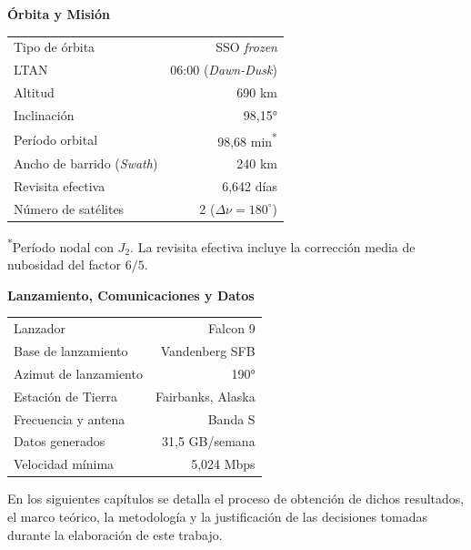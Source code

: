 \begin{table}[!htbp]
\vspace{2em}

\begin{minipage}[t]{0.495\textwidth}
\raggedright
\textbf{Órbita y Misión}
\vspace{0.3em}
\small
\begin{tabular}{@{} l r @{}}
\toprule
Tipo de órbita           & SSO \textit{frozen} \\
LTAN                     & 06:00 (\textit{Dawn-Dusk}) \\
Altitud                  & 690 km  \\
Inclinación              & 98,15° \\
Período orbital          & 98{,}68 min\textsuperscript{*}  \\
Ancho de barrido (\textit{Swath}) & 240 km \\
Revisita efectiva         & 6{,}642 días \\
Número de satélites      & 2 ($\Delta \nu = 180^\circ$)\\
\bottomrule
\end{tabular}
\par\smallskip
\noindent\textsuperscript{*}\footnotesize Período nodal con $J_2$. La revisita efectiva incluye la corrección media de nubosidad del factor $6/5$.
\end{minipage}%
\begin{minipage}[t]{0.495\textwidth}
\raggedleft
\textbf{Lanzamiento, Comunicaciones y Datos}
\vspace{0.3em}
\small
\begin{tabular}{@{} l r @{}}
\toprule
Lanzador                 & Falcon 9 \\
Base de lanzamiento      & Vandenberg SFB \\
Azimut de lanzamiento    & 190° \\
Estación de Tierra       & Fairbanks, Alaska \\
Frecuencia y antena      & Banda S \\
Datos generados          & 31,5 GB/semana\\
Velocidad mínima         & 5,024 Mbps \\
\bottomrule
\end{tabular}
\end{minipage}
\end{table}


\hfill \break

En los siguientes capítulos se detalla el proceso de obtención de dichos resultados, el marco teórico, la metodología y la justificación de las decisiones tomadas durante la elaboración de este trabajo.
